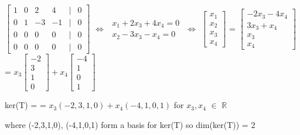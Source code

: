 \begin{tbox}
        \hspace{0.5cm}
        \scriptsize
        $\begin{bmatrix}
            1 & 0 & 2 & 4 & | & 0 \\
            0 & 1 & -3 & -1 & | & 0 \\
            0 & 0 & 0 & 0 & | & 0 \\
            0 & 0 & 0 & 0 & | & 0
        \end{bmatrix}$
        \hspace{0.2cm}
        $\Leftrightarrow$
        \hspace{0.2cm}
        $\begin{matrix*}
            x_1 + 2x_3 + 4x_4 = 0 \\
            x_2 - 3x_3 - x_4 = 0
        \end{matrix*}$
        \hspace{0.2cm}
        $\Leftrightarrow$
        \hspace{0.2cm}
        $\begin{bmatrix}
            x_1 \\
            x_2 \\
            x_3 \\
            x_4
        \end{bmatrix}$ =
        $\begin{bmatrix}
            -2x_3 - 4x_4 \\
            3x_3 + x_4 \\
            x_3 \\
            x_4 
        \end{bmatrix}$ =
        $x_3\begin{bmatrix}
                -2 \\
                3 \\
                1 \\
                0    
            \end{bmatrix} +
        x_4\begin{bmatrix}
                -4 \\
                1 \\
                0 \\
                1    
            \end{bmatrix}$
        
        \normalsize
        \hspace{0.5cm}
        ker(T) =
        = $x_3(-2,3,1,0) + x_4(-4,1,0,1)$
        \hspace{0.5cm}
        for $x_3,x_4$ $\in$ $\mathbb{R}$
        
        \hspace{0.5cm}
        where (-2,3,1,0), (-4,1,0,1) form a basis for ker(T) so dim(ker(T)) = 2
    \end{tbox}


